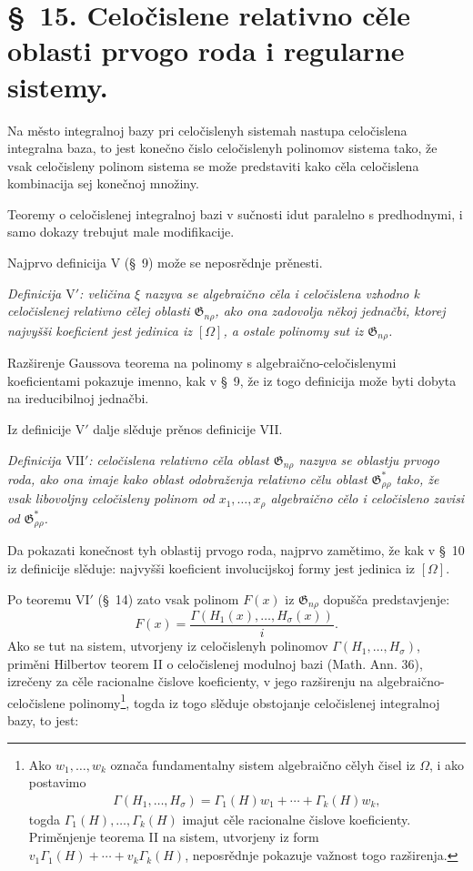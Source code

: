 \documentclass[11pt]{article}
\providecommand{\Gdom}{\mathfrak{G}}
\begin{document}
\section*{\S\ 15. Celočislene relativno cěle oblasti prvogo roda i regularne sistemy.}

Na město integralnoj bazy pri celočislenyh sistemah nastupa celočislena integralna baza, to jest konečno čislo celočislenyh polinomov sistema tako, že vsak celočisleny polinom sistema se može predstaviti kako cěla celočislena kombinacija sej konečnoj množiny.

Teoremy o celočislenej integralnoj bazi v sučnosti idut paralelno s predhodnymi, i samo dokazy trebujut male modifikacije.

Najprvo definicija $\mathrm{V}$ (\S\ 9) može se neposrědnje prěnesti.

{\itshape Definicija $\mathrm{V}'$: veličina $\xi$ nazyva se algebraično cěla i celočislena vzhodno k celočislenej relativno cělej oblasti $\Gdom_{n\rho}$, ako ona zadovolja někoj jednačbi, ktorej najvyšši koeficient jest jedinica iz $[\Omega]$, a ostale polinomy sut iz $\Gdom_{n\rho}$.}

Razširenje Gaussova teorema na polinomy s algebraično-celočislenymi koeficientami pokazuje imenno, kak v \S\ 9, že iz togo definicija može byti dobyta na ireducibilnoj jednačbi.

Iz definicije $\mathrm{V}'$ dalje slěduje prěnos definicije VII.

{\itshape Definicija $\mathrm{VII}'$: celočislena relativno cěla oblast $\Gdom_{n\rho}$ nazyva se oblastju prvogo roda, ako ona imaje kako oblast odobraženja relativno cělu oblast $\Gdom^*_{\rho\rho}$ tako, že vsak libovoljny celočisleny polinom od $x_1,\ldots,x_\rho$ algebraično cělo i celočisleno zavisi od $\Gdom^*_{\rho\rho}$.}

Da pokazati konečnost tyh oblastij prvogo roda, najprvo zamětimo, že kak v \S\ 10 iz definicije slěduje: najvyšši koeficient involucijskoj formy jest jedinica iz $[\Omega]$.

Po teoremu $\mathrm{VI}'$ (\S\ 14) zato vsak polinom $F(x)$ iz $\Gdom_{n\rho}$ dopušča predstavjenje:
\[
  F(x)=\frac{\Gamma(H_1(x),\ldots,H_\sigma(x))}{i}.
\]
Ako se tut na sistem, utvorjeny iz celočislenyh polinomov $\Gamma(H_1,\ldots,H_\sigma)$, priměni Hilbertov teorem II o celočislenej modulnoj bazi (Math. Ann. 36), izrečeny za cěle racionalne čislove koeficienty, v jego razširenju na algebraično-celočislene polinomy\footnote{Ako $w_1,\ldots,w_k$ označa fundamentalny sistem algebraično cělyh čisel iz $\Omega$, i ako postavimo
\[
\begin{gathered}
  \Gamma(H_1,\ldots,H_\sigma)
  =\Gamma_1(H)w_1+\cdots+\Gamma_k(H)w_k,
\end{gathered}
\]
togda $\Gamma_1(H),\ldots,\Gamma_k(H)$ imajut cěle racionalne čislove koeficienty. Priměnjenje teorema II na sistem, utvorjeny iz form $v_1\Gamma_1(H)+\cdots+v_k\Gamma_k(H)$, neposrědnje pokazuje važnost togo razširenja.}, togda iz togo slěduje obstojanje celočislenej integralnoj bazy, to jest:
\end{document}
